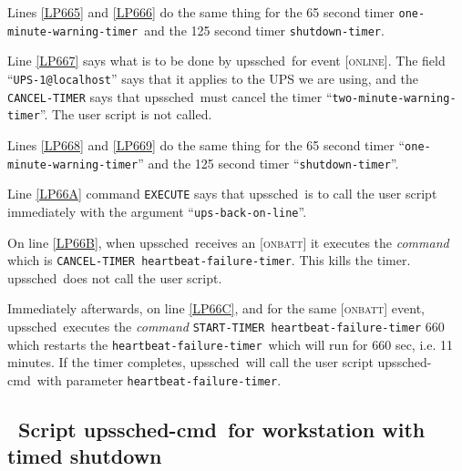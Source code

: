 \documentclass[12pt]{article}
\newlength{\headersep}\setlength{\headersep}{3mm}
\newcommand{\Hsep}{\hspace{\headersep}}
\newcommand{\newcolumn}{\vfill\eject}
\newcommand{\upssched}{\mbox{\textcolor{SCHEDCOLOUR}{upssched}}}
\newcommand{\upsschedcmd}{\mbox{\textcolor{CMDCOLOUR}{upssched-cmd}}}
\newcommand{\ONLINE}{\textcolor{MONCOLOUR}{\textsc{online}}}
\newcommand{\ONBATT}{\textcolor{MONCOLOUR}{\textsc{onbatt}}}
\newcommand{\NOTev}[1]{\textcolor{MONCOLOUR}{[{#1}]}}
\newcommand{\twominwarntim}{\texttt{two-minute{\allowbreak}-warning{\allowbreak}-timer}}
\newcommand{\oneminwarntim}{\texttt{one-minute{\allowbreak}-warning{\allowbreak}-timer}}
\newcommand{\shutdowntimer}{\texttt{shutdown{\allowbreak}-timer}}
\newcommand{\heartfailtimer}{\texttt{heartbeat{\allowbreak}-failure{\allowbreak}-timer}}
\newcommand{\upsbackonline}{\texttt{ups{\allowbreak}-back{\allowbreak}-on{\allowbreak}-line}}
\begin{document}
Lines \ref{LP665} and \ref{LP666} do the same thing for the 65 second timer
\oneminwarntim\ and the 125 second timer \shutdowntimer.

Line \ref{LP667} says what is to be done by \upssched\ for event
\NOTev{\ONLINE}.  The field ``\verb`UPS-1@localhost`'' says that it applies to
the UPS we are using, and the \texttt{CANCEL{\allowbreak}-TIMER} says that
\upssched\ must cancel the timer ``\twominwarntim''.  The user script is not
called.

Lines \ref{LP668} and \ref{LP669} do the same thing for the 65 second timer
``\oneminwarntim'' and the 125 second timer ``\shutdowntimer''.

Line \ref{LP66A} command \texttt{EXECUTE} says that \upssched\ is to call the
user script immediately with the argument ``\upsbackonline''.

On line \ref{LP66B}, when \upssched\ receives an \NOTev{\ONBATT} it executes
the \textsl{command} which is \texttt{CANCEL{\allowbreak}-TIMER
  \heartfailtimer}.  This kills the timer.  \upssched\ does not call the user
script.

Immediately afterwards, on line \ref{LP66C}, and for the same \NOTev{\ONBATT}
event, \upssched\ executes the \textsl{command}
\texttt{START{\allowbreak}-TIMER \heartfailtimer} 660 which restarts the
\heartfailtimer\ which will run for 660 sec, i.e. 11 minutes.  If the timer
completes, \upssched\ will call the user script \upsschedcmd\ with parameter
\heartfailtimer.

\subsection{\Hsep\ Script \upsschedcmd\ for workstation with timed shutdown}\label{section:upsschedcmd.bad}
\end{document}
